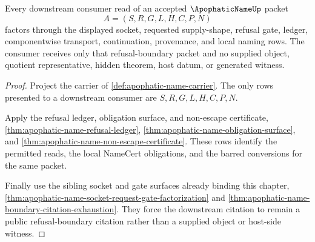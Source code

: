 \begin{theorem}
\label{thm:apophatic-name-downstream-boundary-consumer}
Every downstream consumer read of an accepted $\ApophaticNameUp$ packet
$$
A=(S,R,G,L,H,C,P,N)
$$
factors through the displayed socket, requested supply-shape, refusal gate, ledger, componentwise transport, continuation, provenance, and local naming rows. The consumer receives only that refusal-boundary packet and no supplied object, quotient representative, hidden theorem, host datum, or generated witness.
\end{theorem}
\begin{proof}
Project the carrier of \autoref{def:apophatic-name-carrier}. The only rows presented to a downstream consumer are $S,R,G,L,H,C,P,N$.

Apply the refusal ledger, obligation surface, and non-escape certificate, \autoref{thm:apophatic-name-refusal-ledger}, \autoref{thm:apophatic-name-obligation-surface}, and \autoref{thm:apophatic-name-non-escape-certificate}. These rows identify the permitted reads, the local NameCert obligations, and the barred conversions for the same packet.

Finally use the sibling socket and gate surfaces already binding this chapter, \autoref{thm:apophatic-name-socket-request-gate-factorization} and \autoref{thm:apophatic-name-boundary-citation-exhaustion}. They force the downstream citation to remain a public refusal-boundary citation rather than a supplied object or host-side witness.
\end{proof}

